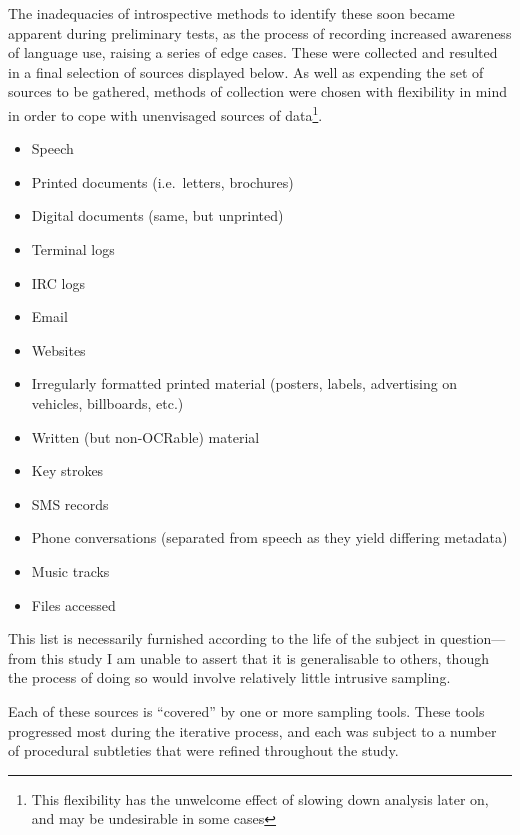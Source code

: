 The inadequacies of introspective methods to identify these soon became apparent during preliminary tests, as the process of recording increased awareness of language use, raising a series of edge cases.  These were collected and resulted in a final selection of sources displayed below.  As well as expending the set of sources to be gathered, methods of collection were chosen with flexibility in mind in order to cope with unenvisaged sources of data\footnote{This flexibility has the unwelcome effect of slowing down analysis later on, and may be undesirable in some cases}.

\begin{itemize}
    \item Speech
    \item Printed documents (i.e.\ letters, brochures)
    \item Digital documents (same, but unprinted)
    \item Terminal logs
    \item IRC logs
    \item Email
    \item Websites
    \item Irregularly formatted printed material (posters, labels, advertising on vehicles, billboards, etc.)
    \item Written (but non-OCRable) material
    \item Key strokes
    \item SMS records
    \item Phone conversations (separated from speech as they yield differing metadata)
    \item Music tracks
    \item Files accessed
\end{itemize}

This list is necessarily furnished according to the life of the subject in question---from this study I am unable to assert that it is generalisable to others, though the process of doing so would involve relatively little intrusive sampling.

Each of these sources is ``covered'' by one or more sampling tools.  These tools progressed most during the iterative process, and each was subject to a number of procedural subtleties that were refined throughout the study.












